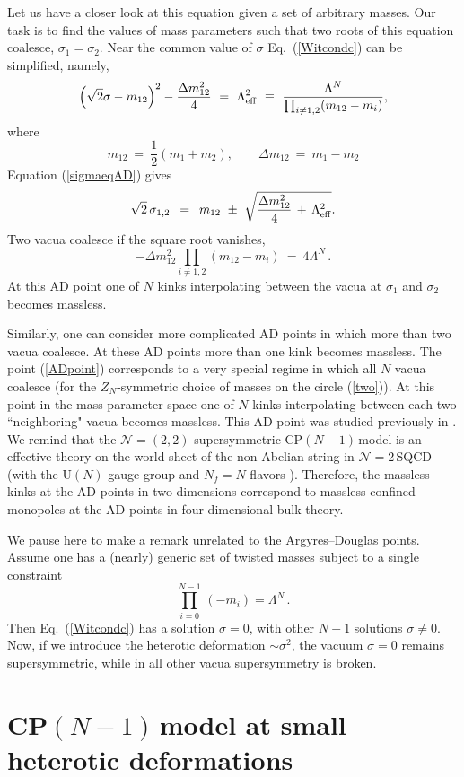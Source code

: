\documentclass[epsfig,12pt]{article}
\def\beq{\begin{equation}}
\def\eeq{\end{equation}}
\newcommand{\ntwo}{${\mathcal N}=2\,$}
\newcommand{\cpn}{CP$(N-1)\,$}
\newcommand{\zn}{$Z_N$}
\def\beq{\begin{equation}}
\def\eeq{\end{equation}}
\newcommand{\ntwot}{${\mathcal N}= \left(2,2\right) $ }
\begin{document}
{Let us have a closer look at this equation given a set of arbitrary masses.
Our task is to find  the values of mass parameters such that
two roots of this equation coalesce, $\sigma_1=\sigma_2$.  Near the common value of
$\sigma$ Eq.~(\ref{Witcondc}) can be simplified, namely,
\beq
\left(\sqrt{2}\sigma-m_{12}\right)^2-\frac{\Delta m^2_{12}}{4} ~=~ \Lambda_{\rm eff}^2 ~\equiv~ 
\frac{\Lambda^N}{\prod_{i\neq 1,2}(m_{12}-m_i)},
\label{sigmaeqAD}
\eeq
where
\beq
m_{12}~=~\frac12(m_1+m_2),\qquad \Delta m_{12}~=~m_1-m_2
\label{m12}
\eeq
Equation (\ref{sigmaeqAD}) gives
\beq
\sqrt{2}\,\sigma_{1,2} \,~=~\, m_{12} ~\pm~ \sqrt{\frac{\Delta m^2_{12}}{4} \,+\, \Lambda_{\rm eff}^2}.
\eeq
Two vacua coalesce if the square root vanishes,
\beq
-\Delta m^2_{12}\prod_{i\neq 1,2}(m_{12}-m_i) ~=~ 4\Lambda^N\,.
\label{AD}
\eeq
At this AD point one of $N$ kinks interpolating between the vacua at $\sigma_1$ and $\sigma_2$
becomes massless.

Similarly, one can consider more complicated AD points in which more than two vacua coalesce.
At these AD points more than one kink becomes massless. The point (\ref{ADpoint})
corresponds to a very special  regime in which  all $N$ vacua coalesce (for the \zn-symmetric choice of 
masses   on the circle (\ref{two})). At this point in the mass parameter space one of $N$ kinks interpolating between each two ``neighboring" vacua becomes massless. This AD point was
studied previously  in \cite{Tadpoint}. We remind that the \ntwot supersymmetric \cpn model
is an effective theory on the world sheet of the non-Abelian string in \ntwo SQCD
(with the U$(N)$ gauge group and $N_f=N$   flavors \cite{HT1,ABEKY,SYmon,HT2}).
Therefore, the massless kinks at the AD points in two dimensions correspond to massless confined monopoles
at the AD points in four-dimensional bulk theory.

We pause here to make a remark unrelated to the Argyres--Douglas points. Assume one has a (nearly) generic
set of twisted masses subject to a single constraint
\beq
\prod_{i=0}^{N-1}\,(-m_i)  = \Lambda^N\,.
\label{weass}
\eeq
Then Eq.~(\ref{Witcondc}) has a solution $\sigma =0$, with other $N-1$ solutions
$\sigma\neq 0$. Now, if we introduce the heterotic deformation $\sim \sigma^2$,
the vacuum $\sigma =0$ remains supersymmetric, while in all other vacua supersymmetry
is broken.

\section{\cpn model at small heterotic  deformations}
\label{hecpnsm}
\setcounter{equation}{0}

}
\end{document}
